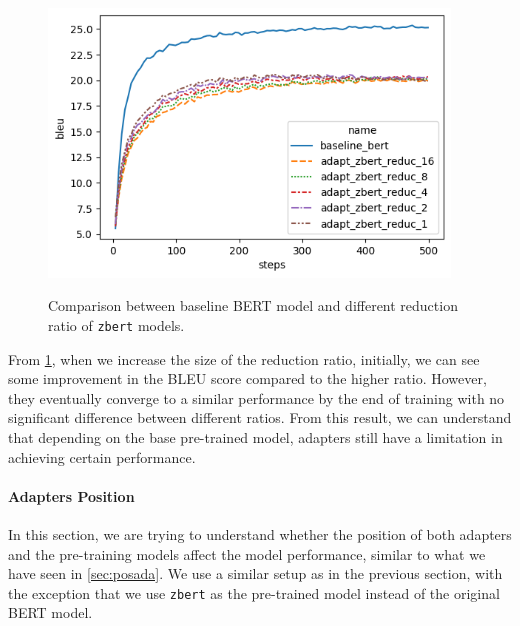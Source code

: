 \begin{figure}[]
    {\includegraphics[width=0.95\textwidth]{img/adapter_zbert_ratio.png}}
    \centering
    \caption{Comparison between baseline BERT model and different reduction ratio of \texttt{zbert} models.}
    \label{img:adapter_zbert_ratio}
\end{figure}

From \cref{img:adapter_zbert_ratio}, when we increase the size of the reduction ratio, initially, we can see some improvement in the BLEU score compared to the higher ratio. However, they eventually converge to a similar performance by the end of training with no significant difference between different ratios. From this result, we can understand that depending on the base pre-trained model, adapters still have a limitation in achieving certain performance.

\paragraph{Adapters Position}
In this section, we are trying to understand whether the position of both adapters and the pre-training models affect the model performance, similar to what we have seen in \cref{sec:posada}. We use a similar setup as in the previous section, with the exception that we use \texttt{zbert} as the pre-trained model instead of the original BERT model.

